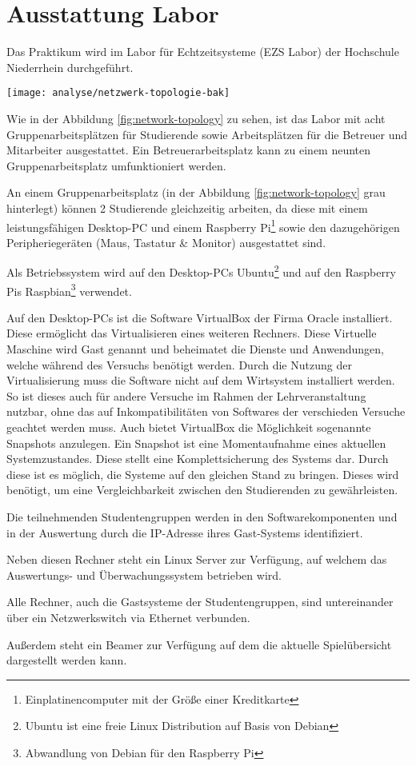 \section{Ausstattung Labor}
\label{sec:Ausstattung_Labor}

Das Praktikum wird im Labor für Echtzeitsysteme (EZS Labor) der Hochschule Niederrhein durchgeführt.

\begin{center}
	\texttt{[image: analyse/netzwerk-topologie-bak]}
	\label{fig:network-topology}
\end{center}

Wie in der Abbildung \ref{fig:network-topology} zu sehen, ist das Labor mit acht Gruppenarbeitsplätzen für Studierende sowie Arbeitsplätzen für die Betreuer und Mitarbeiter ausgestattet. Ein Betreuerarbeitsplatz kann zu einem neunten Gruppenarbeitsplatz umfunktioniert werden.

An einem Gruppenarbeitsplatz (in der Abbildung \ref{fig:network-topology} grau hinterlegt) können 2 Studierende gleichzeitig arbeiten, da diese mit einem leistungsfähigen Desktop-PC und einem Raspberry Pi\footnote{Einplatinencomputer mit der Größe einer Kreditkarte} sowie den dazugehörigen Peripheriegeräten (Maus, Tastatur \& Monitor) ausgestattet sind.

Als Betriebssystem wird auf den Desktop-PCs Ubuntu\footnote{Ubuntu ist eine freie Linux Distribution auf Basis von Debian} und auf den Raspberry Pis Raspbian\footnote{Abwandlung von Debian für den Raspberry Pi} verwendet.

Auf den Desktop-PCs ist die Software VirtualBox der Firma Oracle installiert. Diese ermöglicht das Virtualisieren eines weiteren Rechners. Diese Virtuelle Maschine wird Gast genannt und beheimatet die Dienste und Anwendungen, welche während des Versuchs benötigt werden. Durch die Nutzung der Virtualisierung muss die Software nicht auf dem Wirtsystem installiert werden. So ist dieses auch für andere Versuche im Rahmen der Lehrveranstaltung nutzbar, ohne das auf Inkompatibilitäten von Softwares der verschieden Versuche geachtet werden muss. Auch bietet VirtualBox die Möglichkeit sogenannte Snapshots anzulegen. Ein Snapshot ist eine Momentaufnahme eines aktuellen Systemzustandes. Diese stellt eine Komplettsicherung des Systems dar. Durch diese ist es möglich, die Systeme auf den gleichen Stand zu bringen. Dieses wird benötigt, um eine Vergleichbarkeit zwischen den Studierenden zu gewährleisten.\cite{oraclecorporationOracleVMVirtualBox2020}

Die teilnehmenden Studentengruppen werden in den Softwarekomponenten und in der Auswertung durch die IP-Adresse ihres Gast-Systems identifiziert.

Neben diesen Rechner steht ein Linux Server zur Verfügung, auf welchem das Auswertungs- und Überwachungssystem betrieben wird.

Alle Rechner, auch die Gastsysteme der Studentengruppen, sind untereinander über ein Netzwerkswitch via Ethernet verbunden.

Außerdem steht ein Beamer zur Verfügung auf dem die aktuelle Spielübersicht dargestellt werden kann.
